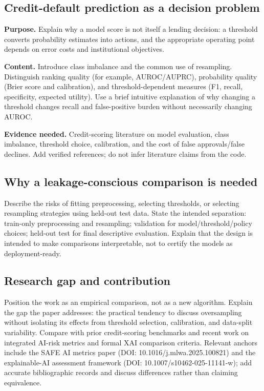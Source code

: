\documentclass[pdflatex,sn-mathphys-num]{sn-jnl}
\begin{document}
\subsection{Credit-default prediction as a decision problem}
\textbf{Purpose.} Explain why a model score is not itself a lending decision: a threshold converts probability estimates into actions, and the appropriate operating point depends on error costs and institutional objectives.

\textbf{Content.} Introduce class imbalance and the common use of resampling. Distinguish ranking quality (for example, AUROC/AUPRC), probability quality (Brier score and calibration), and threshold-dependent measures (F1, recall, specificity, expected utility). Use a brief intuitive explanation of why changing a threshold changes recall and false-positive burden without necessarily changing AUROC.

\textbf{Evidence needed.} Credit-scoring literature on model evaluation, class imbalance, threshold choice, calibration, and the cost of false approvals/false declines. Add verified references; do not infer literature claims from the code.

\subsection{Why a leakage-conscious comparison is needed}
Describe the risks of fitting preprocessing, selecting thresholds, or selecting resampling strategies using held-out test data. State the intended separation: train-only preprocessing and resampling; validation for model/threshold/policy choices; held-out test for final descriptive evaluation. Explain that the design is intended to make comparisons interpretable, not to certify the models as deployment-ready.

\subsection{Research gap and contribution}
Position the work as an empirical comparison, not as a new algorithm. Explain the gap the paper addresses: the practical tendency to discuss oversampling without isolating its effects from threshold selection, calibration, and data-split variability. Compare with prior credit-scoring benchmarks and recent work on integrated AI-risk metrics and formal XAI comparison criteria. Relevant anchors include the SAFE AI metrics paper (DOI: 10.1016/j.mlwa.2025.100821) and the explainable-AI assessment framework (DOI: 10.1007/s10462-025-11141-w); add accurate bibliographic records and discuss differences rather than claiming equivalence.
\end{document}

